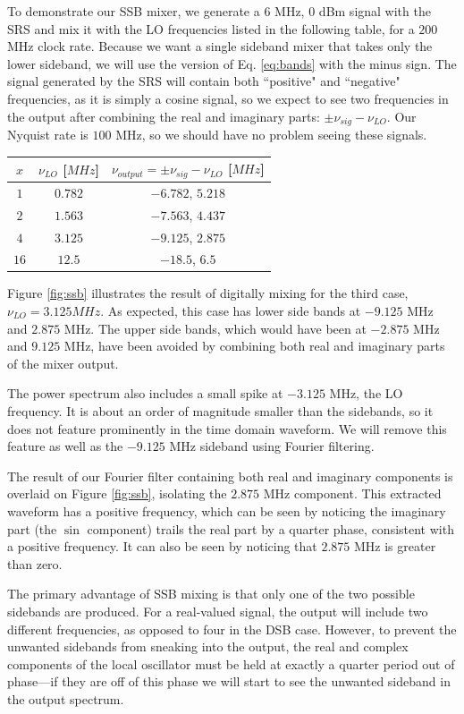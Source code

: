 \documentclass[12pt]{article}
\begin{document}
To demonstrate our SSB mixer, we generate a $6$ MHz, $0$ dBm signal with the SRS and mix it with the LO frequencies listed in the following table, for a $200$ MHz clock rate. Because we want a single sideband mixer that takes only the lower sideband, we will use the version of Eq. \ref{eq:bands} with the minus sign. The signal generated by the SRS will contain both ``positive" and ``negative" frequencies, as it is simply a cosine signal, so we expect to see two frequencies in the output after combining the real and imaginary parts: $\pm \nu_{sig} - \nu_{LO}$. Our Nyquist rate is $100$ MHz, so we should have no problem seeing these signals.
\begin{center}
  \begin{tabular}{ c | c | c }
    $x$ & $\nu_{LO}$ [$MHz$] & $\nu_{output} = \pm \nu_{sig} - \nu_{LO}$ [$MHz$]\\ \hline
    $1$ & $0.782 $ & $-6.782$, $5.218 $ \\
    $2$ & $1.563 $ & $-7.563$, $4.437$\\
    $4$ & $3.125 $ & $-9.125$, $2.875$ \\
    $16$ & $12.5 $ & $-18.5$, $6.5$\\
  \end{tabular}
\end{center}

Figure \ref{fig:ssb} illustrates the result of digitally mixing for the third case, $\nu_{LO} = 3.125 MHz$. As expected, this case has lower side bands at $-9.125$ MHz and $2.875$ MHz. The upper side bands, which would have been at $-2.875$ MHz and $9.125$ MHz, have been avoided by combining both real and imaginary parts of the mixer output.

The power spectrum also includes a small spike at $-3.125$ MHz, the LO frequency. It is about an order of magnitude smaller than the sidebands, so it does not feature prominently in the time domain waveform. We will remove this feature as well as the $-9.125$ MHz sideband using Fourier filtering.

The result of our Fourier filter containing both real and imaginary components is overlaid on Figure \ref{fig:ssb}, isolating the $2.875$ MHz component. This extracted waveform has a positive frequency, which can be seen by noticing the imaginary part (the $\sin$ component) trails the real part by a quarter phase, consistent with a positive frequency. It can also be seen by noticing that $2.875$ MHz is greater than zero.

The primary advantage of SSB mixing is that only one of the two possible sidebands are produced. For a real-valued signal, the output will include two different frequencies, as opposed to four in the DSB case. However, to prevent the unwanted sidebands from sneaking into the output, the real and complex components of the local oscillator must be held at exactly a quarter period out of phase---if they are off of this phase we will start to see the unwanted sideband in the output spectrum.
\end{document}
